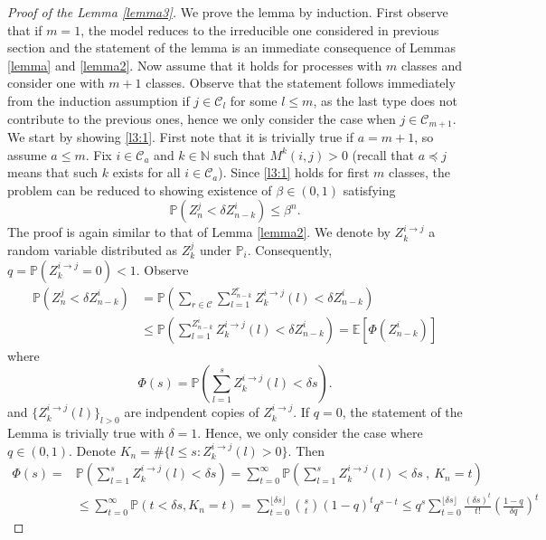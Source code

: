 \documentclass[10pt,a4paper]{amsart}
\begin{document}
\begin{proof}[Proof of the Lemma \ref{lemma3}]
    We prove the lemma by induction. First observe that if $m=1$, the model reduces to the irreducible one considered in previous section and the statement of the lemma is an immediate consequence of Lemmas \ref{lemma} and \ref{lemma2}. Now assume that it holds for processes with $m$ classes and consider one with $m+1$ classes.
    Observe that the statement follows immediately from the induction assumption if $j \in \mathcal{C}_l$ for some $l\leq m$, as the last type does not contribute to the previous ones, hence we only consider the case when $j \in \mathcal{C}_{m+1}$. We start by showing \eqref{l3:1}. First note that it is trivially true if $a = m+1$, so assume $a \leq m$. Fix $i \in \mathcal{C}_a$ and $k \in \mathbb{N}$ such that $M^k(i,j) > 0$ (recall that $a \preceq j$ means that such $k$ exists for all $i \in \mathcal{C}_a$). Since \eqref{l3:1} holds for first $m$ classes, the problem can be reduced to showing existence of $\beta \in (0,1)$ satisfying
    \begin{equation}\label{l3:eq1}
       \mathbb{P}\left(Z^j_n < \delta  Z^i_{n-k}\right) \leq \beta^n.
    \end{equation}
   The proof is again similar to that of Lemma \ref{lemma2}. We denote by $Z_k^{i \rightarrow j}$ a random variable distributed as $Z_k^j$ under $\mathbb{P}_i$. Consequently, $q = \mathbb{P} \left( Z_k^{i \rightarrow j} = 0 \right) < 1$. Observe
    \begin{align*}
            \mathbb{P}\left(Z^j_n < \delta  Z^i_{n-k} \right) &= \mathbb{P} \left( \sum_{r \in \mathcal{C}} \sum_{l = 1}^{Z^r_{n-k}} Z_k^{i \rightarrow j} (l)< \delta  Z^i_{n-k} \right) \\&\leq  \mathbb{P} \left(  \sum_{l = 1}^{Z^i_{n-k}} Z_k^{i \rightarrow j} (l)< \delta  Z^i_{n-k} \right) = \mathbb{E} \left[\Phi\left(Z_{n-k}^i\right)\right]
    \end{align*}
where 
\[
\Phi(s) =  \mathbb{P} \left(  \sum_{l = 1}^{s} Z_k^{i \rightarrow j}(l) < \delta  s \right).
\]
and $\{Z_k^{i \rightarrow j} (l)\}_{l >0} $ are indpendent copies of $Z_k^{i \rightarrow j}$. 
If $q = 0$, the statement of the Lemma is trivially true with $\delta = 1$. Hence, we only consider the case where $q \in (0,1)$. Denote $K_n = \#\{l \leq s: Z_k^{i \rightarrow j}(l) > 0\}$. Then 
 \begin{align*}
     \Phi(s) = &\mathbb{P}\left(\sum_{l=1}^{s} Z_k^{i \rightarrow j}(l) < \delta s \right) = \sum_{t=0}^\infty \mathbb{P}\left(\sum_{l=1}^{s} Z_k^{i \rightarrow j}(l) < \delta s \ , \ K_n =t\right) \\&\leq \sum_{t=0}^\infty \mathbb{P}(t <\delta s,K_n=t) = \sum_{t=0}^{\lfloor \delta s \rfloor} \binom{s}{t} (1- q)^t q^{s-t} \leq q^s\sum_{t=0}^{\lfloor \delta s \rfloor}\frac {(\delta s)^t} {t!} \left(\frac {1-q} {\delta q}\right)^t

\end{align*}
\end{proof}
\end{document}
